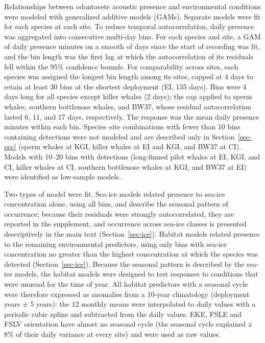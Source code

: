 \documentclass[
  11pt,
]{article}
\begin{document}
Relationships between odontocete acoustic presence and environmental
conditions were modeled with generalized additive models (GAMs).
Separate models were fit for each species at each site. To reduce
temporal autocorrelation, daily presence was aggregated into consecutive
multi-day bins. For each species and site, a GAM of daily presence
minutes on a smooth of days since the start of recording was fit, and
the bin length was the first lag at which the autocorrelation of its
residuals fell within the 95\% confidence bounds. For comparability
across sites, each species was assigned the longest bin length among its
sites, capped at 4 days to retain at least 30 bins at the shortest
deployment (EI, 135 days). Bins were 4 days long for all species except
killer whales (2 days); the cap applied to sperm whales, southern
bottlenose whales, and BW37, whose residual autocorrelation lasted 6,
11, and 17 days, respectively. The response was the mean daily presence
minutes within each bin. Species--site combinations with fewer than 10
bins containing detections were not modeled and are described only in
Section~\ref{sec-occ} (sperm whales at KGI, killer whales at EI and KGI,
and BW37 at CI). Models with 10--20 bins with detections (long-finned
pilot whales at EI, KGI, and CI, killer whales at CI, southern
bottlenose whales at KGI, and BW37 at EI) were identified as low-sample
models.

Two types of model were fit. Sea-ice models related presence to sea-ice
concentration alone, using all bins, and describe the seasonal pattern
of occurrence; because their residuals were strongly autocorrelated,
they are reported in the supplement, and occurrence across sea-ice
classes is presented descriptively in the main text
(Section~\ref{sec-ice}). Habitat models related presence to the
remaining environmental predictors, using only bins with sea-ice
concentration no greater than the highest concentration at which the
species was detected (Section~\ref{sec-ice}). Because the seasonal
pattern is described by the sea-ice models, the habitat models were
designed to test responses to conditions that were unusual for the time
of year. All habitat predictors with a seasonal cycle were therefore
expressed as anomalies from a 10-year climatology (deployment years ± 5
years): the 12 monthly means were interpolated to daily values with a
periodic cubic spline and subtracted from the daily values. EKE, FSLE
and FSLV orientation have almost no seasonal cycle (the seasonal cycle
explained ≤ 8\% of their daily variance at every site) and were used as
raw values.
\end{document}
